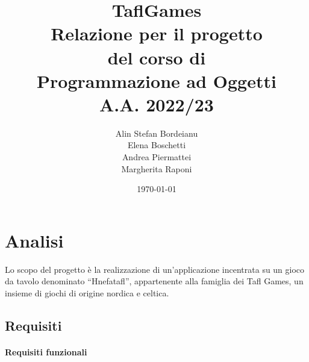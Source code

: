 \documentclass[a4paper,12pt]{report}
\title{TaflGames\\\large Relazione per il progetto \\ del corso di \\ Programmazione ad Oggetti \\ A.A. 2022/23}
\author{Alin Stefan Bordeianu \\ Elena Boschetti \\ Andrea Piermattei \\ Margherita Raponi}
\date{\today}
\begin{document}
\maketitle

\tableofcontents

\chapter{Analisi}

Lo scopo del progetto è la realizzazione di un'applicazione incentrata su un gioco da tavolo denominato “Hnefatafl”, appartenente alla famiglia dei Tafl Games, un insieme di giochi di origine nordica e celtica. 

\section{Requisiti}

\subsubsection{Requisiti funzionali}
\end{document}
